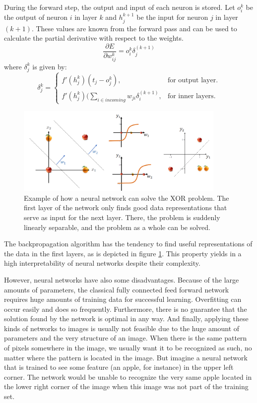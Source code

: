 \documentclass[11pt,a4paper]{article}
\begin{document}
During the forward step, the output and input of each neuron is stored. Let $o_i^k$ be the output of neuron $i$ in layer $k$ and $h_j^{k+1}$ be the input for neuron $j$ in layer $(k+1)$. These values are known from the forward pass and can be used to calculate the partial derivative with respect to the weights.
\begin{equation*}
\frac{\partial E}{\partial w_{ij}^k} = o_i^k \delta_j^{(k+1)}
\end{equation*}
where $\delta_j^k$ is given by:
\begin{equation*}
\delta_j^k = \begin{cases}
	f'(h_j^k) (t_j - o_j^k), & \text{for output layer}.\\
	f'(h_j^k)(\sum_{i \in incoming} w_{ji} \delta_i^{(k+1)}, & \text{for inner layers}.
\end{cases}
\end{equation*}
\begin{figure}[h!]
\includegraphics[width=0.9\textwidth]{ann_intuition.png}
\centering
\caption[Hierarchical Learning in aNNs]{Example of how a neural network can solve the XOR problem. The first layer of the network only finds good data representations that serve as input for the next layer. There, the problem is suddenly linearly separable, and the problem as a whole can be solved.}
\label{fig:annIntuition}
\end{figure}
The backpropagation algorithm has the tendency to find useful representations of the data in the first layers, as is depicted in figure \ref{fig:annIntuition}. This property yields in a high interpretability of neural networks despite their complexity.

However, neural networks have also some disadvantages. Because of the large amounts of parameters, the classical fully connected feed forward network requires huge amounts of training data for successful learning. Overfitting can occur easily and does so frequently. Furthermore, there is no guarantee that the solution found by the network is optimal in any way.
And finally, applying these kinds of networks to images is usually not feasible due to the huge amount of parameters and the very structure of an image. When there is the same pattern of pixels somewhere in the image, we usually want it to be recognized as such, no matter where the pattern is located in the image. But imagine a neural network that is trained to see some feature (an apple, for instance) in the upper left corner. The network would be unable to recognize the very same apple located in the lower right corner of the image when this image was not part of the training set.
\end{document}
